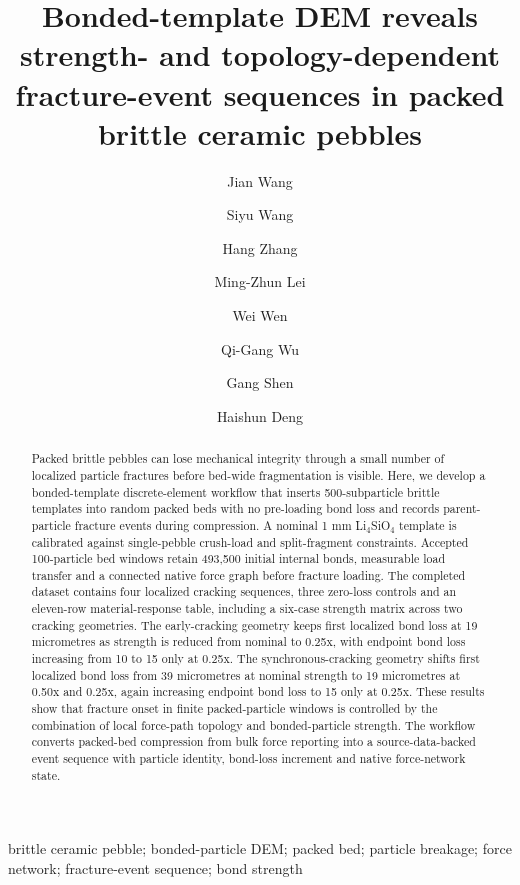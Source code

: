 \documentclass[preprint,12pt]{elsarticle}
\begin{document}
\begin{frontmatter}
\title{\texorpdfstring{Bonded-template DEM reveals strength- and topology-dependent fracture-event sequences in packed brittle ceramic pebbles}{Bonded-template DEM reveals strength- and topology-dependent fracture-event sequences in packed brittle ceramic pebbles}}
\author[aff1,aff2]{Jian Wang}
\author[aff1]{Siyu Wang}
\author[aff1]{Hang Zhang}
\author[aff2]{Ming-Zhun Lei}
\author[aff1,aff2]{Wei Wen}
\author[aff2]{Qi-Gang Wu}
\author[aff1]{Gang Shen}
\author[aff1]{Haishun Deng}
\address[aff1]{Anhui University of Science and Technology, Huainan, Anhui 232001, China}
\address[aff2]{Institute of Plasma Physics, Chinese Academy of Sciences, Hefei, Anhui 230031, China}










\begin{abstract}

Packed brittle pebbles can lose mechanical integrity through a small number of localized particle fractures before bed-wide fragmentation is visible. Here, we develop a bonded-template discrete-element workflow that inserts 500-subparticle brittle templates into random packed beds with no pre-loading bond loss and records parent-particle fracture events during compression. A nominal 1 mm Li$_4$SiO$_4$ template is calibrated against single-pebble crush-load and split-fragment constraints. Accepted 100-particle bed windows retain 493,500 initial internal bonds, measurable load transfer and a connected native force graph before fracture loading. The completed dataset contains four localized cracking sequences, three zero-loss controls and an eleven-row material-response table, including a six-case strength matrix across two cracking geometries. The early-cracking geometry keeps first localized bond loss at 19 micrometres as strength is reduced from nominal to 0.25x, with endpoint bond loss increasing from 10 to 15 only at 0.25x. The synchronous-cracking geometry shifts first localized bond loss from 39 micrometres at nominal strength to 19 micrometres at 0.50x and 0.25x, again increasing endpoint bond loss to 15 only at 0.25x. These results show that fracture onset in finite packed-particle windows is controlled by the combination of local force-path topology and bonded-particle strength. The workflow converts packed-bed compression from bulk force reporting into a source-data-backed event sequence with particle identity, bond-loss increment and native force-network state.


\end{abstract}

\begin{keyword}
brittle ceramic pebble; bonded-particle DEM; packed bed; particle breakage; force network; fracture-event sequence; bond strength
\end{keyword}
\end{frontmatter}
\end{document}
